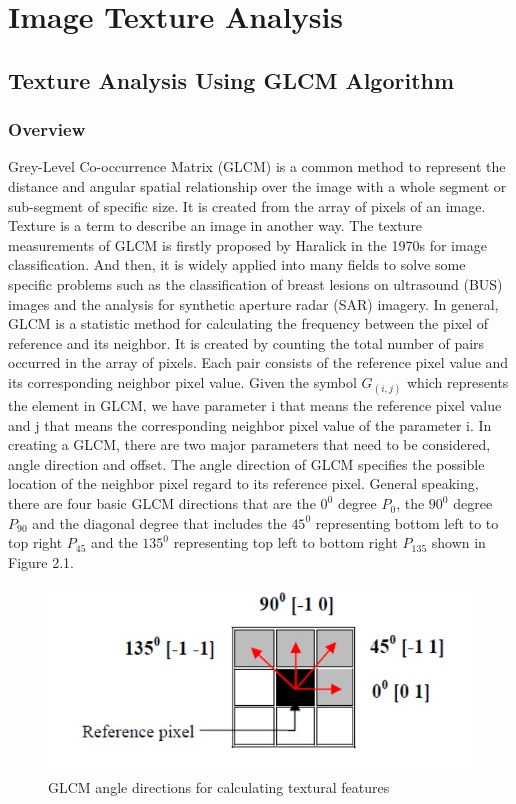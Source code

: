 
\renewcommand{\thechapter}{2}

\chapter{Image Texture Analysis}

\section{Texture Analysis Using GLCM Algorithm}

\subsection{Overview}
Grey-Level Co-occurrence Matrix (GLCM) is a common method to represent the distance and angular spatial relationship over the image with a whole segment or sub-segment of specific size. It is created from the array of pixels of an image. Texture is a term to describe an image in another way. The texture measurements of GLCM is firstly proposed by Haralick in the 1970s for image classification\cite{Haralick}. And then, it is widely applied into many fields to solve some specific problems such as the classification of breast lesions on ultrasound (BUS) images\cite{Gomez} and the analysis for synthetic aperture radar (SAR) imagery\cite{Umasankar}. In general, GLCM is a statistic method for calculating the frequency between the pixel of reference and its neighbor. It is created by counting the total number of pairs occurred in the array of pixels. Each pair consists of the reference pixel value and its corresponding neighbor pixel value. Given the symbol $G_{(i,j)}$ which represents the element in GLCM,  we have parameter i that means the reference pixel value and j that means the corresponding neighbor pixel value of the parameter i. In creating a GLCM, there are two major parameters that need to be considered, angle direction and offset. The angle direction of GLCM specifies the possible location of the neighbor pixel regard to its reference pixel. General speaking, there are four basic GLCM directions that are the $0^0$ degree $P_0$, the $90^0$ degree $P_{90}$ and the diagonal degree that includes the $45^0$ representing bottom left to to top right $P_{45}$ and the $135^0$ representing top left to bottom right $P_{135}$ shown in Figure 2.1. 
\begin{figure}[!t]
\includegraphics{GLCM_direction_sample}
\caption{GLCM angle directions for calculating textural features\cite{Biswajit}}
\end{figure}
